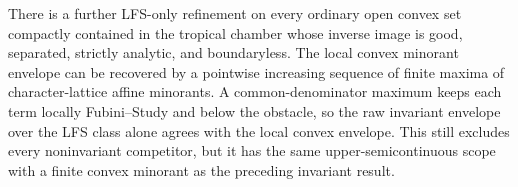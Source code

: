 There is a further LFS-only refinement on every ordinary open convex set
compactly contained in the tropical chamber whose inverse image is good, separated,
strictly analytic, and boundaryless.  The local convex minorant envelope can
be recovered by a pointwise increasing sequence of finite maxima of
character-lattice affine minorants.  A common-denominator maximum keeps each
term locally Fubini--Study and below the obstacle, so the raw invariant
envelope over the LFS class alone agrees with the local convex envelope.
This still excludes every noninvariant
competitor, but it has the same upper-semicontinuous scope with a finite
convex minorant as the preceding invariant result.



